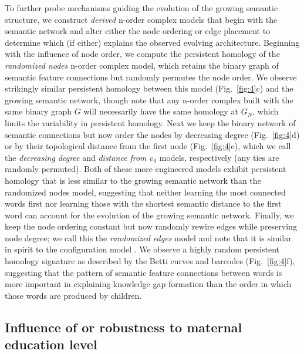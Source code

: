 \documentclass{article}
\begin{document}
To further probe mechanisms guiding the evolution of the growing semantic structure, we construct \emph{derived} n-order complex models that begin with the semantic network and alter either the node ordering or edge placement to determine which (if either) explains the observed evolving architecture. Beginning with the influence of node order, we compute the persistent homology of the \emph{randomized nodes} n-order complex model, which retains the binary graph of semantic feature connections but randomly permutes the node order. We observe strikingly similar persistent homology between this model (Fig.~\ref{fig:4}c) and the growing semantic network, though note that any n-order complex built with the same binary graph $G$ will necessarily have the same homology at $G_N$, which limits the variability in persistent homology. Next we keep the binary network of semantic connections but now order the nodes by decreasing degree (Fig.~\ref{fig:4}d) or by their topological distance from the first node (Fig.~\ref{fig:4}e), which we call the \emph{decreasing degree} and \emph{distance from $v_0$} models, respectively (any ties are randomly permuted). Both of these more engineered models exhibit persistent homology that is less similar to the growing semantic network than the randomized nodes model, suggesting that neither learning the most connected words first nor learning those with the shortest semantic distance to the first word can account for the evolution of the growing semantic network. Finally, we keep the node ordering constant but now randomly rewire edges while preserving node degree; we call this the \emph{randomized edges} model and note that it is similar in spirit to the configuration model \cite{bender1978asymptotic,maslov2002specificity}. We observe a highly random persistent homology signature as described by the Betti curves and barcodes (Fig.~\ref{fig:4}f), suggesting that the pattern of semantic feature connections between words is more important in explaining knowledge gap formation than the order in which those words are produced by children.


\subsection*{Influence of or robustness to maternal education level}
\end{document}

